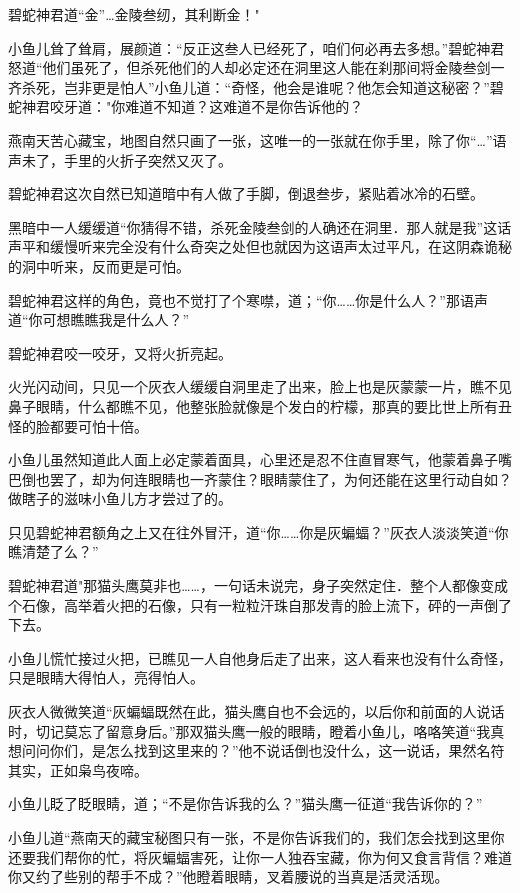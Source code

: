 \documentclass[12pt,oneside]{book}
\begin{document}
碧蛇神君道``金''\ldots 金陵叁纫，其利断金！"

小鱼儿耸了耸肩，展颜道：``反正这叁人已经死了，咱们何必再去多想。''碧蛇神君怒道``他们虽死了，但杀死他们的人却必定还在洞里这人能在刹那间将金陵叁剑一齐杀死，岂非更是怕人''小鱼儿道：``奇怪，他会是谁呢？他怎会知道这秘密？''碧蛇神君咬牙道："你难道不知道？这难道不是你告诉他的？

燕南天苦心藏宝，地图自然只画了一张，这唯一的一张就在你手里，除了你``\ldots{}''语声未了，手里的火折子突然又灭了。

碧蛇神君这次自然已知道暗中有人做了手脚，倒退叁步，紧贴着冰冷的石壁。

黑暗中一人缓缓道``你猜得不错，杀死金陵叁剑的人确还在洞里．那人就是我''这话声平和缓慢听来完全没有什么奇突之处但也就因为这语声太过平凡，在这阴森诡秘的洞中听来，反而更是可怕。

碧蛇神君这样的角色，竟也不觉打了个寒噤，道；``你\ldots\ldots 你是什么人？''那语声道``你可想瞧瞧我是什么人？''

碧蛇神君咬一咬牙，又将火折亮起。

火光闪动间，只见一个灰衣人缓缓自洞里走了出来，脸上也是灰蒙蒙一片，瞧不见鼻子眼睛，什么都瞧不见，他整张脸就像是个发白的柠檬，那真的要比世上所有丑怪的脸都要可怕十倍。

小鱼儿虽然知道此人面上必定蒙着面具，心里还是忍不住直冒寒气，他蒙着鼻子嘴巴倒也罢了，却为何连眼睛也一齐蒙住？眼睛蒙住了，为何还能在这里行动自如？做瞎子的滋味小鱼儿方才尝过了的。

只见碧蛇神君额角之上又在往外冒汗，道``你\ldots\ldots 你是灰蝙蝠？''灰衣人淡淡笑道``你瞧清楚了么？''

碧蛇神君道"那猫头鹰莫非也\ldots\ldots，一句话未说完，身子突然定住．整个人都像变成个石像，高举着火把的石像，只有一粒粒汗珠自那发青的脸上流下，砰的一声倒了下去。

小鱼儿慌忙接过火把，已瞧见一人自他身后走了出来，这人看来也没有什么奇怪，只是眼睛大得怕人，亮得怕人。

灰衣人微微笑道``灰蝙蝠既然在此，猫头鹰自也不会远的，以后你和前面的人说话时，切记莫忘了留意身后。''那双猫头鹰一般的眼睛，瞪着小鱼儿，咯咯笑道``我真想问问你们，是怎么找到这里来的？''他不说话倒也没什么，这一说话，果然名符其实，正如枭鸟夜啼。

小鱼儿眨了眨眼睛，道；``不是你告诉我的么？''猫头鹰一征道``我告诉你的？''

小鱼儿道``燕南天的藏宝秘图只有一张，不是你告诉我们的，我们怎会找到这里你还要我们帮你的忙，将灰蝙蝠害死，让你一人独吞宝藏，你为何又食言背信？难道你又约了些别的帮手不成？''他瞪着眼睛，叉着腰说的当真是活灵活现。
\end{document}
